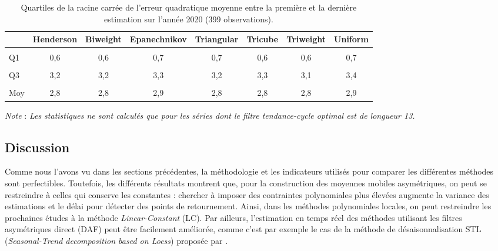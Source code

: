 \documentclass[
  11pt,
  french,
  a4paper]{article}
\newcommand\1{\mathds{1}}
\begin{document}
\begin{table}[!h]

\caption{\label{tab:covid-rev-kernels}Quartiles de la racine carrée de l'erreur quadratique moyenne entre la première et la dernière estimation sur l'année 2020 (399 observations).}
\centering
\begin{tabular}[t]{lccccccc}
\toprule
  & Henderson & Biweight & Epanechnikov & Triangular & Tricube & Triweight & Uniform\\
\midrule
\cellcolor{gray!6}{Min} & \cellcolor{gray!6}{0,1} & \cellcolor{gray!6}{0,1} & \cellcolor{gray!6}{0,1} & \cellcolor{gray!6}{0,1} & \cellcolor{gray!6}{0,1} & \cellcolor{gray!6}{0,1} & \cellcolor{gray!6}{0,1}\\
Q1 & 0,6 & 0,6 & 0,7 & 0,7 & 0,6 & 0,6 & 0,7\\
\cellcolor{gray!6}{Méd.} & \cellcolor{gray!6}{1,5} & \cellcolor{gray!6}{1,5} & \cellcolor{gray!6}{1,6} & \cellcolor{gray!6}{1,5} & \cellcolor{gray!6}{1,5} & \cellcolor{gray!6}{1,5} & \cellcolor{gray!6}{1,5}\\
Q3 & 3,2 & 3,2 & 3,3 & 3,2 & 3,3 & 3,1 & 3,4\\
\cellcolor{gray!6}{Max} & \cellcolor{gray!6}{41,0} & \cellcolor{gray!6}{41,1} & \cellcolor{gray!6}{39,4} & \cellcolor{gray!6}{40,3} & \cellcolor{gray!6}{41,3} & \cellcolor{gray!6}{39,5} & \cellcolor{gray!6}{39,7}\\
\addlinespace
Moy & 2,8 & 2,8 & 2,9 & 2,8 & 2,8 & 2,8 & 2,9\\
\bottomrule
\end{tabular}
\footnotesize


\emph{Note} : \emph{Les statistiques ne sont calculés que pour les séries dont le filtre tendance-cycle optimal est de longueur 13.}
\normalsize\end{table}

\hypertarget{discussion}{%
\subsection{Discussion}\label{discussion}}

Comme nous l'avons vu dans les sections précédentes, la méthodologie et les indicateurs utilisés pour comparer les différentes méthodes sont perfectibles.
Toutefois, les différents résultats montrent que, pour la construction des moyennes mobiles asymétriques, on peut se restreindre à celles qui conserve les constantes : chercher à imposer des contraintes polynomiales plus élevées augmente la variance des estimations et le délai pour détecter des points de retournement.
Ainsi, dans les méthodes polynomiales locales, on peut restreindre les prochaines études à la méthode \emph{Linear-Constant} (LC).
Par ailleurs, l'estimation en temps réel des méthodes utilisant les filtres asymétriques direct (DAF) peut être facilement améliorée, comme c'est par exemple le cas de la méthode de désaisonnalisation STL (\emph{Seasonal-Trend decomposition based on Loess}) proposée par \textcite{cleveland90}.
\end{document}
